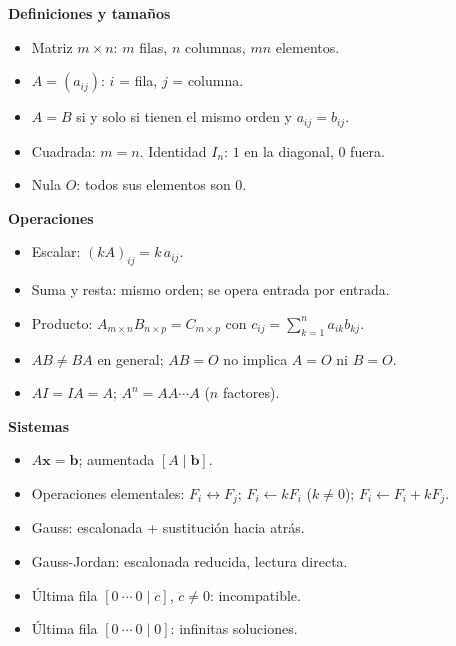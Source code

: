 \documentclass[12pt, letterpaper]{article}
\begin{document}
\begin{cuadroteoria}
  \small
  \textbf{Definiciones y tamaños}
  \begin{itemize}[leftmargin=1.2em, nosep]
    \item Matriz $m\times n$: $m$ filas, $n$ columnas, $mn$ elementos.
    \item $A=(a_{ij})$: $i$ = fila, $j$ = columna.
    \item $A=B$ si y solo si tienen el mismo orden y $a_{ij}=b_{ij}$.
    \item Cuadrada: $m=n$. Identidad $I_n$: $1$ en la diagonal, $0$ fuera.
    \item Nula $O$: todos sus elementos son $0$.
  \end{itemize}

  \medskip
  \textbf{Operaciones}
  \begin{itemize}[leftmargin=1.2em, nosep]
    \item Escalar: $(kA)_{ij}=k\,a_{ij}$.
    \item Suma y resta: mismo orden; se opera entrada por entrada.
    \item Producto: $A_{m\times n}B_{n\times p}=C_{m\times p}$ con
          $c_{ij}=\sum_{k=1}^{n}a_{ik}b_{kj}$.
    \item $AB\neq BA$ en general; $AB=O$ no implica $A=O$ ni $B=O$.
    \item $AI=IA=A$; $A^n=AA\cdots A$ ($n$ factores).
  \end{itemize}

  \medskip
  \textbf{Sistemas}
  \begin{itemize}[leftmargin=1.2em, nosep]
    \item $A\mathbf{x}=\mathbf{b}$; aumentada $[A\mid\mathbf{b}]$.
    \item Operaciones elementales: $F_i\leftrightarrow F_j$;
          $F_i\leftarrow kF_i$ ($k\neq0$);
          $F_i\leftarrow F_i+kF_j$.
    \item Gauss: escalonada + sustitución hacia atrás.
    \item Gauss-Jordan: escalonada reducida, lectura directa.
    \item Última fila $[0\ \cdots\ 0\mid c]$, $c\neq0$: incompatible.
    \item Última fila $[0\ \cdots\ 0\mid 0]$: infinitas soluciones.
  \end{itemize}
\end{cuadroteoria}
\end{document}
